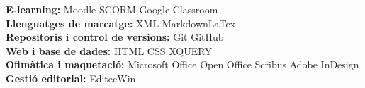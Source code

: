 

\begin{cvparagraph}


\textbf{E-learning:}\hspace{0.3cm} {Moodle}{\quad\textbar\quad} {SCORM} {\quad\textbar\quad} {Google Classroom} \\
\textbf{Llenguatges de marcatge:}\hspace{0.3cm} {XML}{\quad\textbar\quad} {Markdown}{\quad\textbar\quad}{LaTex} \\
\textbf{Repositoris i control de versions:} \hspace{0.3cm} {Git{\quad\textbar\quad} GitHub} \\
\textbf{Web i base de dades:} \hspace{0.3cm} {HTML}{\quad\textbar\quad} {CSS}{\quad\textbar\quad} {XQUERY} \\
\textbf{Ofimàtica i maquetació:} \hspace{0.3cm} {Microsoft Office{\quad\textbar\quad} Open Office{\quad\textbar\quad} Scribus{\quad\textbar\quad} Adobe InDesign} \\
\textbf{Gestió editorial:} \hspace{0.3cm} {EditecWin} \\

\end{cvparagraph}